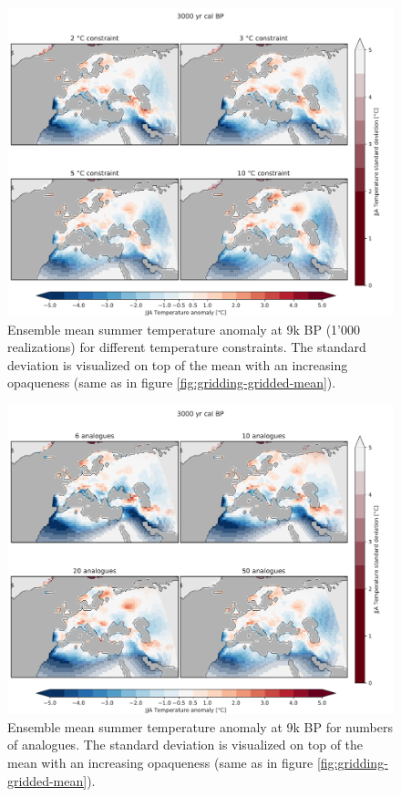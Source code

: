 \documentclass[
11pt, %
english, %
singlespacing, %
headsepline, %
]{MastersDoctoralThesis} %
\begin{document}
\begin{NoHyper}
\begin{refsection}
\begin{figure}
	\includegraphics[width=\linewidth,page=3]{gridding-figures/temperature-means-per-thresh.pdf}
	\caption[Impact of climate constraint on gridded results]{Ensemble mean summer temperature anomaly at 9k BP (1'000 realizations) for different temperature constraints. The standard deviation is visualized on top of the mean with an increasing opaqueness (same as in figure \ref{fig:gridding-gridded-mean}).}
	\label{fig:gridding-gridded-climate-constraint}
\end{figure}

\begin{figure}
	\includegraphics[width=\linewidth,page=3]{gridding-figures/temperature-means-per-k.pdf}
	\caption[Impact of the number of analogues on the gridded results]{Ensemble mean summer temperature anomaly at 9k BP for numbers of analogues. The standard deviation is visualized on top of the mean with an increasing opaqueness (same as in figure \ref{fig:gridding-gridded-mean}).}
	\label{fig:gridding-gridded-k}
\end{figure}


\end{refsection}
\end{NoHyper}
\end{document}
